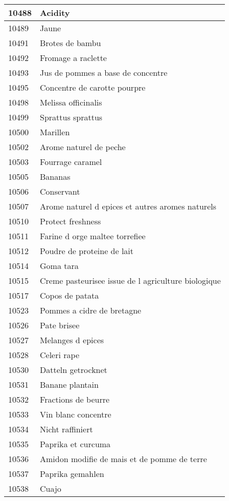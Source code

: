 \begin{longtable}{|l|l|}
10488 & Acidity \\ \hline 
10489 & Jaune \\ \hline 
10491 & Brotes de bambu \\ \hline 
10492 & Fromage a raclette \\ \hline 
10493 & Jus de pommes a base de concentre \\ \hline 
10495 & Concentre de carotte pourpre \\ \hline 
10498 & Melissa officinalis \\ \hline 
10499 & Sprattus sprattus \\ \hline 
10500 & Marillen \\ \hline 
10502 & Arome naturel de peche \\ \hline 
10503 & Fourrage caramel \\ \hline 
10505 & Bananas \\ \hline 
10506 & Conservant \\ \hline 
10507 & Arome naturel d epices et autres aromes naturels \\ \hline 
10510 & Protect freshness \\ \hline 
10511 & Farine d orge maltee torrefiee \\ \hline 
10512 & Poudre de proteine de lait \\ \hline 
10514 & Goma tara \\ \hline 
10515 & Creme pasteurisee issue de l agriculture biologique \\ \hline 
10517 & Copos de patata \\ \hline 
10523 & Pommes a cidre de bretagne \\ \hline 
10526 & Pate brisee \\ \hline 
10527 & Melanges d epices \\ \hline 
10528 & Celeri rape \\ \hline 
10530 & Datteln getrocknet \\ \hline 
10531 & Banane plantain \\ \hline 
10532 & Fractions de beurre \\ \hline 
10533 & Vin blanc concentre \\ \hline 
10534 & Nicht raffiniert \\ \hline 
10535 & Paprika et curcuma \\ \hline 
10536 & Amidon modifie de mais et de pomme de terre \\ \hline 
10537 & Paprika gemahlen \\ \hline 
10538 & Cuajo \\ \hline 

\end{longtable}
